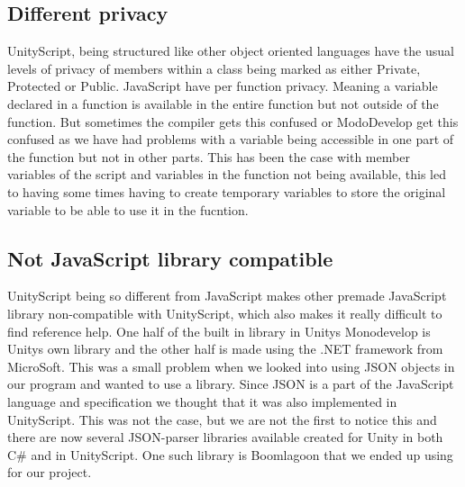 \subsection {Different privacy}
UnityScript, being structured like other object oriented languages have the usual levels of privacy of members within a class being marked as either Private, Protected or Public. 
JavaScript have per function privacy. 
Meaning a variable declared in a function is available in the entire function but not outside of the function.
But sometimes the compiler gets this confused or ModoDevelop get this confused as we have had problems with a variable being accessible in one part of the function but not in other parts.
This has been the case with member variables of the script and variables in the function not being available, this led to having some times having to create temporary variables to store the original variable to be able to use it in the fucntion.
%

\subsection {Not JavaScript library compatible}
UnityScript being so different from JavaScript makes other premade JavaScript library non-compatible with UnityScript, which also makes it really difficult to find reference help. 
One half of the built in library in Unitys Monodevelop is Unitys own library and the other half is made using the .NET framework from MicroSoft.
This was a small problem when we looked into using {JSON} objects in our program and wanted to use a library.
Since {JSON} is a part of the JavaScript language and specification we thought that it was also implemented in UnityScript.
This was not the case, but we are not the first to notice this and there are now several {JSON}-parser libraries available created for Unity in both C\# and in UnityScript.
One such library is Boomlagoon\cite{Boomlagoon.JSON} that we ended up using for our project.
